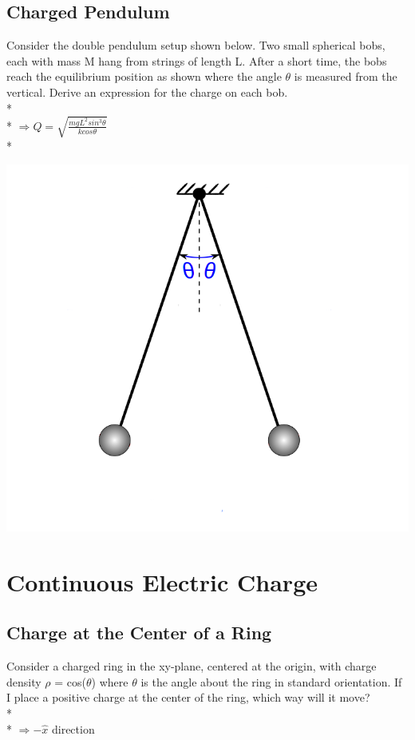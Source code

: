 \documentclass[11pt]{article}
\begin{document}
\pagebreak
\subsection{Charged Pendulum}
Consider the double pendulum setup shown below.  Two small spherical bobs, each with mass M hang from strings of length L.  After a short time, the bobs reach the equilibrium position as shown where the angle $\theta$ is measured from the vertical.  Derive an expression for the charge on each bob.\\* \\*
$\Rightarrow Q = \sqrt{\frac{mgL^2sin^3\theta}{kcos\theta}}$ \\*

\begin{center}
\includegraphics[scale=0.25]{Images/pendulum.png}
\end{center}


\pagebreak
\section{Continuous Electric Charge}
\vspace{10pt}

\subsection{Charge at the Center of a Ring}
Consider a charged ring in the xy-plane, centered at the origin, with charge density $\rho$ = cos($\theta$) where $\theta$ is the angle about the ring in standard orientation.  If I place a positive charge at the center of the ring, which way will it move? \\* \\*
$\Rightarrow -\hat{x}$ direction
\end{document}
